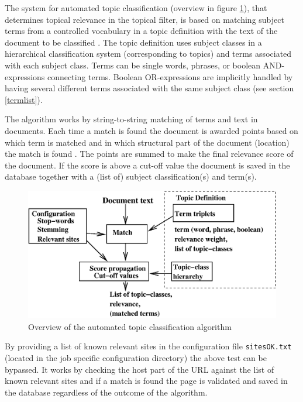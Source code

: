 The system for automated topic classification (overview in figure \ref{topicfilter}), that determines
topical relevance in the topical filter, is based on matching subject
terms from a controlled vocabulary in a topic
definition with the text of the document to be classified
\cite{ardo99:_online99}. The topic definition uses
subject classes in a hierarchical classification system (corresponding
to topics) and terms
associated with each subject class. Terms can be single words, phrases,
 or boolean AND-expressions connecting terms.
Boolean OR-expressions are implicitly handled by having several
different terms associated with the same subject class (see section \ref{termlist}).

The algorithm works by string-to-string matching of terms and
text in documents.
Each time a match is found the document is awarded points based on
which term is matched and in which structural part of the document
(location) the match is found \cite{ardo05:_ECDL}.  The points are summed to make the final
relevance score of the document. If the score is above a cut-off value the
document is saved in the database together with a (list of) subject
classification(s) and term(s).

\begin{figure}[htb]
\begin{center}
 \includegraphics[width=\textwidth]{TopicFilter.xfig.eps}
\end{center}
\caption{Overview of the automated topic classification algorithm}
\label{topicfilter}
\end{figure}

By providing a list of known relevant sites in the configuration
file {\tt sitesOK.txt} (located in the job specific configuration directory) the above test can be bypassed. It works by checking the host
part of the URL against the list of known relevant sites and if a
match is found the page is validated and saved in the database
regardless of the outcome of the algorithm.

